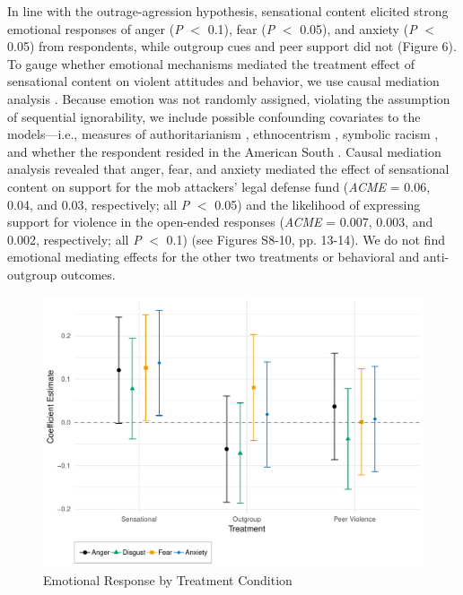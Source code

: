 \documentclass[12pt, letterpaper]{article}
\begin{document}
In line with the outrage-agression hypothesis, sensational content elicited strong emotional responses of anger (\textit{P} $<$ 0.1), fear (\textit{P} $<$ 0.05), and anxiety (\textit{P} $<$ 0.05) from respondents, while outgroup cues and peer support did not (Figure 6). To gauge whether emotional mechanisms mediated the treatment effect of sensational content on violent attitudes and behavior, we use causal mediation analysis \citep{imai2011commentary}. Because emotion was not randomly assigned, violating the assumption of sequential ignorability, we include possible confounding covariates to the models---i.e., measures of authoritarianism \citep{stenner2005authoritarian}, ethnocentrism \citep{kinder2010us}, symbolic racism \citep{banks2014anger}, and whether the respondent resided in the American South \citep{nisbett1996culture}. Causal mediation analysis revealed that anger, fear, and anxiety mediated the effect of sensational content on support for the mob attackers' legal defense fund (\textit{ACME} = 0.06, 0.04, and 0.03, respectively; all \textit{P} $<$ 0.05) and the likelihood of expressing support for violence in the open-ended responses (\textit{ACME} = 0.007, 0.003, and 0.002, respectively; all \textit{P} $<$ 0.1) (see Figures S8-10, pp. 13-14). We do not find emotional mediating effects for the other two treatments or behavioral and anti-outgroup outcomes.

\begin{figure}[!htbp]
  \centering
  \caption{Emotional Response by Treatment Condition}
  \includegraphics[width=.835\textwidth]{figures/ATE_emotion.pdf}
\end{figure}
\end{document}
